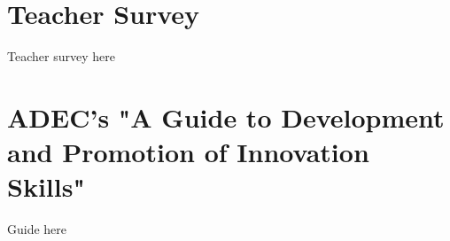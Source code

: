 \begin{appendices}
\section{Teacher Survey}
\label{appendix:teachersurvey}
Teacher survey here

\section{ADEC's "A Guide to Development and Promotion of Innovation Skills"}
\label{appendix:adec}
Guide here

\end{appendices}

